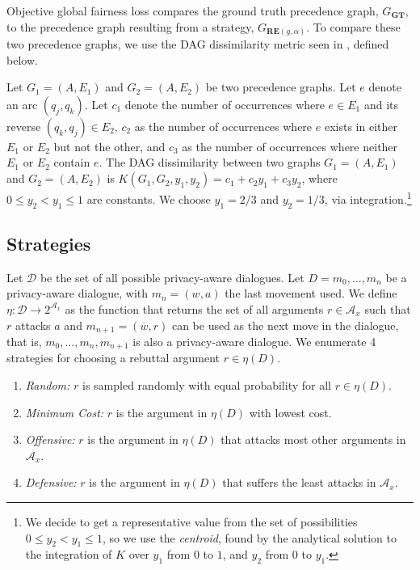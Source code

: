 \documentclass[acmsmall]{custom-arxiv}  %
\begin{document}
Objective global fairness loss compares the ground truth precedence graph, $G_{\mathbf{GT}}$, to the precedence graph resulting from a strategy, $G_{\mathbf{RE}(g, \alpha)}$. To compare these two precedence graphs, we use the DAG dissimilarity metric seen in \citep{Malmi2015BeyondGraphs}, defined below.

Let $G_1 = (A, E_1)$ and $G_2 = (A, E_2)$ be two precedence graphs. Let $e$ denote an arc $(q_j, q_k)$. Let $c_1$ denote the number of occurrences where $e \in E_1$ and its reverse $(q_k, q_j) \in E_2$, $c_2$ as the number of occurrences where $e$ exists in either $E_1$ or $E_2$ but not the other, and $c_3$ as the number of occurrences where neither $E_1$ or $E_2$ contain $e$. The DAG dissimilarity between two graphs $G_1 = (A, E_1)$ and $G_2 = (A, E_2)$ is $K(G_1, G_2, y_1, y_2) = c_1 + c_2y_1 + c_3y_2$, where $0 \leq y_2 < y_1 \leq 1$ are constants. We choose $y_1 = 2/3$ and $y_2 = 1/3$, via integration.\footnote{We decide to get a representative value from the set of possibilities $0 \leq y_2 < y_1 \leq 1$, so we use the \textit{centroid}, found by the analytical solution to the integration of $K$ over $y_1$ from $0$ to $1$, and $y_2$ from $0$ to $y_1$.}

\subsection{Strategies}
\label{subsection:strategies}
Let $\mathcal{D}$ be the set of all possible privacy-aware dialogues. Let $D = m_0, \dots, m_n$ be a privacy-aware dialogue, with $m_n = (w,a)$ the last movement used. We define $\eta : \mathcal{D} \rightarrow 2^{\mathcal{A}_x}$ as the function that returns the set of all arguments $r \in \mathcal{A}_x$ such that $r$ attacks $a$ and $m_{n+1} = (\overline{w},r)$ can be used as the next move in the dialogue, that is, $m_0, \dots, m_n, m_{n+1}$ is also a privacy-aware dialogue. We enumerate 4 strategies for choosing a rebuttal argument $r \in \eta(D)$.

\begin{enumerate}
    \item \textit{Random:} $r$ is sampled randomly with equal probability for all $r \in \eta(D)$.
    \item \textit{Minimum Cost:} $r$ is the argument in $\eta(D)$ with lowest cost.
    \item \textit{Offensive:} $r$ is the argument in $\eta(D)$ that attacks most other arguments in $\mathcal{A}_x$.
    \item \textit{Defensive:} $r$ is the argument in $\eta(D)$ that suffers the least attacks in $\mathcal{A}_x$.
\end{enumerate}
\end{document}
